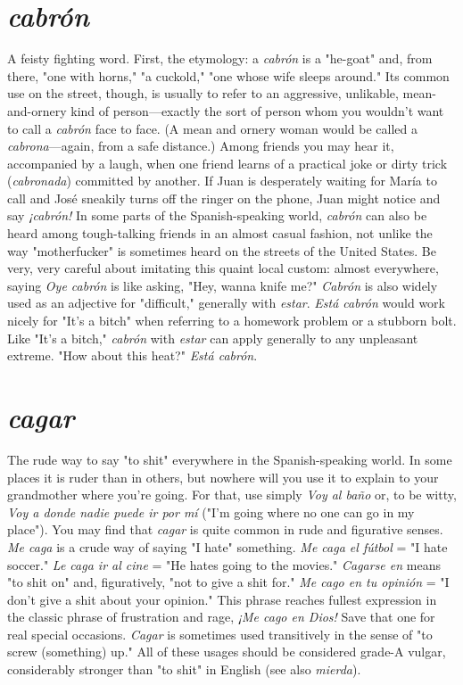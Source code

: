 \section{\emph{cabrón}}

A feisty fighting word. First, the etymology: a \emph{cabrón} is a "he-goat" and, from there, "one with horns," "a cuckold," "one whose wife
sleeps around." Its common use on the street, though, is usually to
refer to an aggressive, unlikable, mean-and-ornery kind of person---exactly the sort of person whom you wouldn't want to call a \emph{cabrón}
face to face. (A mean and ornery woman would be called a \emph{cabrona}---again, from a safe distance.) Among friends you may hear it, accompanied by a laugh, when one friend learns of a practical joke or dirty trick
(\emph{cabronada}) committed by another. If Juan is desperately waiting for
María to call and José sneakily turns off the ringer on the phone, Juan
might notice and say \emph{¡cabrón!} In some parts of the Spanish-speaking
world, \emph{cabrón} can also be heard among tough-talking friends in an almost casual fashion, not unlike the way "motherfucker" is sometimes
heard on the streets of the United States. Be very, very careful about
imitating this quaint local custom: almost everywhere, saying \emph{Oye cabrón} is like asking, "Hey, wanna knife me?" \emph{Cabrón} is also widely
used as an adjective for "difficult," generally with \emph{estar}. \emph{Está cabrón}
would work nicely for "It's a bitch" when referring to a homework
problem or a stubborn bolt. Like "It's a bitch," \emph{cabrón} with \emph{estar} can
apply generally to any unpleasant extreme. "How about this heat?"
\emph{Está cabrón}.

\section{\emph{cagar}}

The rude way to say "to shit" everywhere in the Spanish-speaking world. In some places it is ruder than in others, but nowhere
will you use it to explain to your grandmother where you're going. For
that, use simply \emph{Voy al baño} or, to be witty, \emph{Voy a donde nadie puede
ir por mí} ("I'm going where no one can go in my place").
You may find that \emph{cagar} is quite common in rude and figurative senses. \emph{Me caga} is a crude way of saying "I hate" something. \emph{Me
caga el fútbol} = "I hate soccer." \emph{Le caga ir al cine} = "He hates going
to the movies." \emph{Cagarse en} means "to shit on" and, figuratively, "not
to give a shit for." \emph{Me cago en tu opinión} = "I don't give a shit about
your opinion." This phrase reaches fullest expression in the classic
phrase of frustration and rage, \emph{¡Me cago en Dios!} Save that one for real
special occasions. \emph{Cagar} is sometimes used transitively in the sense of
"to screw (something) up." All of these usages should be considered
grade-A vulgar, considerably stronger than "to shit" in English (see
also \emph{mierda}).

